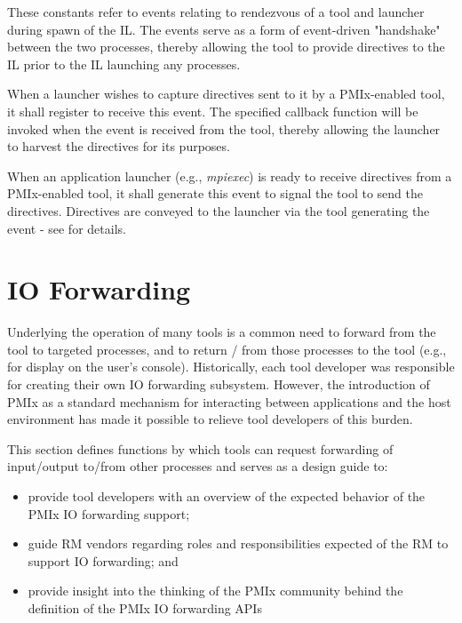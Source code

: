 These constants refer to events relating to rendezvous of a tool and launcher during spawn of the \ac{IL}. The events serve as a form of event-driven "handshake" between the two processes, thereby allowing the tool to provide directives to the \ac{IL} prior to the \ac{IL} launching any processes.

\begin{constantdesc}

%
When a launcher wishes to capture directives sent to it by a \ac{PMIx}-enabled tool, it shall register to receive this event. The specified callback function will be invoked when the event is received from the tool, thereby allowing the launcher to harvest the directives for its purposes.

%
When an application launcher (e.g., \emph{mpiexec}) is ready to receive directives from a \ac{PMIx}-enabled tool, it shall generate this event to signal the tool to send the directives. Directives are conveyed to the launcher via the tool generating the  event - see  for details.


\end{constantdesc}

\section{IO Forwarding}
\label{chap:api_tools:iof}


Underlying the operation of many tools is a common need to forward  from the tool to targeted processes, and to return / from those processes to the tool (e.g., for display on the user’s console). Historically, each tool developer was responsible for creating their own \ac{IO} forwarding subsystem. However, the introduction of \ac{PMIx} as a standard mechanism for interacting between applications and the host environment has made it possible to relieve tool developers of this burden.

This section defines functions by which tools can request forwarding of input/output to/from other processes and serves as a design guide to:

\begin{itemize}
    \item provide tool developers with an overview of the expected behavior of the \ac{PMIx} \ac{IO} forwarding support;
    \item guide \ac{RM} vendors regarding roles and responsibilities expected of the \ac{RM} to support \ac{IO} forwarding; and
    \item provide insight into the thinking of the \ac{PMIx} community behind the definition of the \ac{PMIx} \ac{IO} forwarding \acp{API}
\end{itemize}

